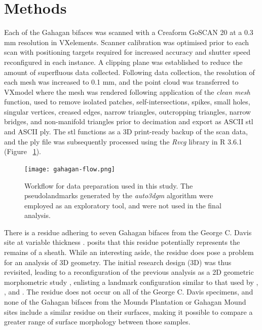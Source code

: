 \documentclass[review]{elsarticle}
\begin{document}
\section*{Methods}

Each of the Gahagan bifaces was scanned with a Creaform GoSCAN 20 at a 0.3 mm resolution in VXelements. Scanner calibration was optimised prior to each scan with positioning targets required for increased accuracy and shutter speed reconfigured in each instance. A clipping plane was established to reduce the amount of superfluous data collected. Following data collection, the resolution of each mesh was increased to 0.1 mm, and the point cloud was transferred to VXmodel where the mesh was rendered following application of the \textit{clean mesh} function, used to remove isolated patches, self-intersections, spikes, small holes, singular vertices, creased edges, narrow triangles, outcropping triangles, narrow bridges, and non-manifold triangles prior to decimation and export as ASCII stl and ASCII ply. The stl functions as a 3D print-ready backup of the scan data, and the ply file was subsequently processed using the \textit{Rvcg} library in R 3.6.1 \citep{RN20849,R,RN20850} (Figure ~\ref{fig:figflow}).

\begin{figure}[ht!]\centering
\texttt{[image: gahagan-flow.png]}
\caption{Workflow for data preparation used in this study. The pseudolandmarks generated by the \textit{auto3dgm} algorithm were employed as an exploratory tool, and were not used in the final analysis.}
\label{fig:figflow}
\end{figure}

There is a residue adhering to seven Gahagan bifaces from the George C. Davis site at variable thickness \citep[Figure 2]{RN11783}. \citet[228]{RN3684} posits that this residue potentially represents the remains of a sheath. While an interesting aside, the residue does pose a problem for an analysis of 3D geometry. The initial research design (3D) was thus revisited, leading to a reconfiguration of the previous analysis as a 2D geometric morphometric study \citep{RN11783}, enlisting a landmark configuration similar to that used by \citet[Figure 2]{RN1754}, \citet[Figure 2]{RN1736}, and \citet[Figure 1]{RN11731}. The residue does not occur on all of the George C. Davis specimens, and none of the Gahagan bifaces from the Mounds Plantation or Gahagan Mound sites include a similar residue on their surfaces, making it possible to compare a greater range of surface morphology between those samples.
\end{document}
